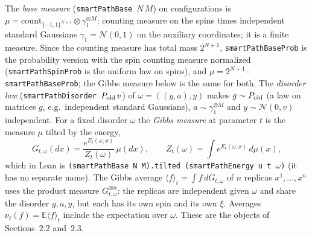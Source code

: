 \begin{definition}\label{def:sg-tal:perceptron-smartpath-laws}
  \leanok
The \emph{base measure} (\texttt{smartPathBase}~$N\,M$) on configurations is
$\mu=\mathrm{count}_{\{-1,1\}^{N+1}}\otimes\gamma_1^{\otimes M}$: counting measure on the spins times independent standard
Gaussians $\gamma_1=\mathcal N(0,1)$ on the auxiliary coordinates; it is a finite measure. Since the counting measure has total mass
$2^{N+1}$, \texttt{smartPathBaseProb} is the probability version with the spin counting measure normalized (\texttt{smartPathSpinProb}
is the uniform law on spins), and $\mu=2^{N+1}\cdot$\texttt{smartPathBaseProb}; the Gibbs measure below is the same for both.
The \emph{disorder law} (\texttt{smartPathDisorder}~$P_{\rm old}\,v$) of $\omega=((g,a),y)$ makes $g\sim P_{\rm old}$ (a law on matrices
$g$, e.g.\ independent standard Gaussians), $a\sim\gamma_1^{\otimes M}$ and $y\sim\mathcal N(0,v)$ independent.
For a fixed disorder $\omega$ the \emph{Gibbs measure} at parameter $t$ is the measure $\mu$ tilted by the energy,
\[
 G_{t,\omega}(dx)=\frac{e^{E_t(\omega,x)}}{Z_t(\omega)}\,\mu(dx),\qquad Z_t(\omega)=\int e^{E_t(\omega,x)}\,d\mu(x),
\]
which in Lean is \texttt{(smartPathBase N M).tilted (smartPathEnergy u t $\omega$)} (it has no separate name). The Gibbs average
$\langle f\rangle_t=\int f\,dG_{t,\omega}$ of $n$ replicas $x^1,\dots,x^n$ uses the product measure $G_{t,\omega}^{\otimes n}$:
the replicas are independent given $\omega$ and share the disorder $g,a,y$, but each has its own spin and its own $\xi$.
Averages $\nu_t(f)=\mathbb E\langle f\rangle_t$ include the expectation over $\omega$. These are the objects of Sections~2.2 and~2.3.
\end{definition}

